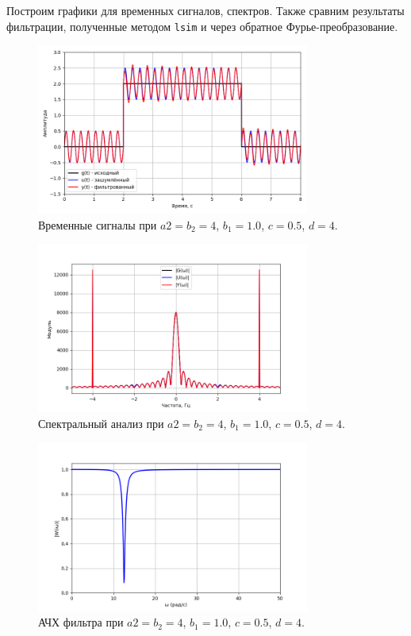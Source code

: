 \documentclass[a4paper]{article}
\begin{document}
Построим графики для временных сигналов, спектров. Также сравним результаты фильтрации, полученные методом \texttt{lsim} и через обратное Фурье-преобразование.
\begin{figure}[H]
  \centering
  \includegraphics[width=0.8\textwidth]{src/task_1_2/2. time_157_1_0.5.png}
  \caption{Временные сигналы при $a2 = b_2 = 4$, $b_1=1.0$, $c=0.5$, $d=4$.}
\end{figure}

\begin{figure}[H]
  \centering
  \includegraphics[width=0.8\textwidth]{src/task_1_2/2. spec_157_1_0.5.png}
  \caption{Спектральный анализ при $a2 = b_2 = 4$, $b_1=1.0$, $c=0.5$, $d=4$.}
\end{figure}

\begin{figure}[H]
  \centering
  \includegraphics[width=0.8\textwidth]{src/task_1_2/1. ach_157_1_0.5.png}
  \caption{АЧХ фильтра при $a2 = b_2 = 4$, $b_1=1.0$, $c=0.5$, $d=4$.}
\end{figure}
\end{document}
